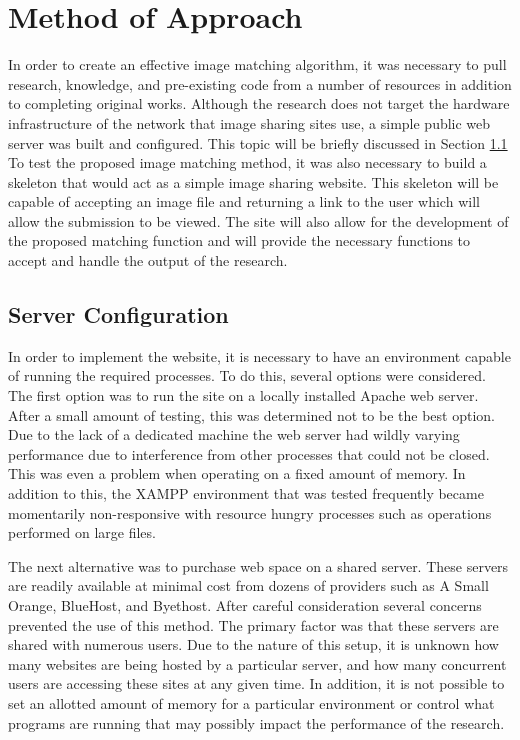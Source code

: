 %
%
%
\chapter{Method of Approach} \label{ch:method}
In order to create an effective image matching algorithm, it was necessary to pull research, knowledge, and pre-existing code from a number of resources in addition to completing original works. Although the research does not target the hardware infrastructure of the network that image sharing sites use, a simple public web server was built and configured. This topic will be briefly discussed in Section \ref{sec:serverconfig} To test the proposed image matching method, it was also necessary to build a skeleton that would act as a simple image sharing website. This skeleton will be capable of accepting an image file and returning a link to the user which will allow the submission to be viewed. The site will also allow for the development of the proposed matching function and will provide the necessary functions to accept and handle the output of the research.

\section{Server Configuration} \label{sec:serverconfig}
In order to implement the website, it is necessary to have an environment capable of running the required processes. To do this, several options were considered. The first option was to run the site on a locally installed Apache web server. After a small amount of testing, this was determined not to be the best option. Due to the lack of a dedicated machine the web server had wildly varying performance due to interference from other processes that could not be closed. This was even a problem when operating on a fixed amount of memory. In addition to this, the XAMPP environment that was tested frequently became momentarily non-responsive with resource hungry processes such as operations performed on large files.

The next alternative was to purchase web space on a shared server. These servers are readily available at minimal cost from dozens of providers such as A Small Orange, BlueHost, and Byethost. After careful consideration several concerns prevented the use of this method. The primary factor was that these servers are shared with numerous users. Due to the nature of this setup, it is unknown how many websites are being hosted by a particular server, and how many concurrent users are accessing these sites at any given time. In addition, it is not possible to set an allotted amount of memory for a particular environment or control what programs are running that may possibly impact the performance of the research.


